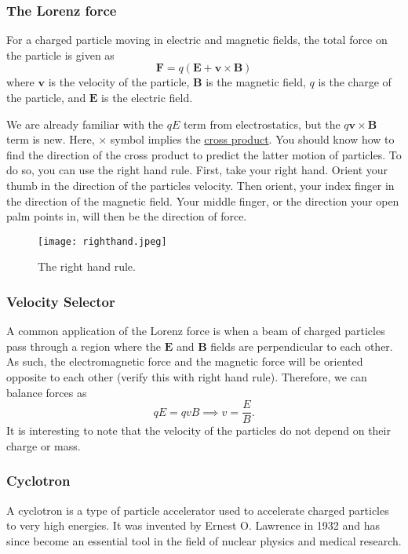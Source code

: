 \documentclass[12pt]{article}
\let\vec\mathbf
\begin{document}
  \subsubsection{The Lorenz force}
  \begin{idea}
  For a charged particle moving in electric and magnetic fields, the total force on the particle is given as 
  \[\vec F = q(\vec E + \vec v \times \vec B)\]
  where $\vec v$ is the velocity of the particle, $\vec B$ is the magnetic field, $q$ is the charge of the particle, and $\vec E$ is the electric field.
  \end{idea}
  We are already familiar with the $qE$ term from electrostatics, but the $q\vec v \times \vec B$ term is new. Here, $\times$ symbol implies the \href{https://en.wikipedia.org/wiki/Cross_product}{cross product}. You should know how to find the direction of the cross product to predict the latter motion of particles. To do so, you can use the right hand rule. First, take your right hand. Orient your thumb in the direction of the particles velocity. Then orient, your index finger in the direction of the magnetic field. Your middle finger, or the direction your open palm points in, will then be the direction of force. 
  \begin{figure}[H]
  \centering
      \texttt{[image: righthand.jpeg]}
      \caption{The right hand rule.}
  \end{figure}
  \subsubsection{Velocity Selector}
  A common application of the Lorenz force is when a beam of charged particles pass through a region where the $\vec E$ and $\vec B$ fields are perpendicular to each other. As such, the electromagnetic force and the magnetic force will be oriented opposite to each other (verify this with right hand rule). Therefore, we can balance forces as 
  \[qE = qvB\implies v = \frac{E}{B}.\]
  It is interesting to note that the velocity of the particles do not depend on their charge or mass. 
  \subsubsection{Cyclotron}
  A cyclotron is a type of particle accelerator used to accelerate charged particles to very high energies. It was invented by Ernest O. Lawrence in 1932 and has since become an essential tool in the field of nuclear physics and medical research.
\end{document}
